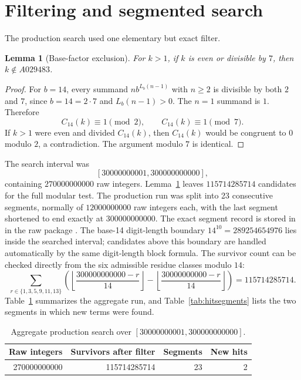 \documentclass[11pt]{article}
\newtheorem{lemma}{Lemma}
\theoremstyle{definition}
\theoremstyle{remark}
\begin{document}
\section{Filtering and segmented search}
\label{sec:search}

The production search used one elementary but exact filter.

\begin{lemma}[Base-factor exclusion]
\label{lem:filter}
For \(k>1\), if \(k\) is even or divisible by \(7\), then \(k\notin A029483\).
\end{lemma}

\begin{proof}
For \(b=14\), every summand \(n b^{L_b(n-1)}\) with \(n\ge 2\) is divisible
by both \(2\) and \(7\), since \(b=14=2\cdot 7\) and \(L_b(n-1)>0\).  The
\(n=1\) summand is \(1\).
Therefore
\[
  C_{14}(k)\equiv 1\pmod 2,\qquad C_{14}(k)\equiv 1\pmod 7.
\]
If \(k>1\) were even and divided \(C_{14}(k)\), then \(C_{14}(k)\) would be
congruent to \(0\) modulo \(2\), a contradiction.  The argument modulo \(7\)
is identical.
\end{proof}

The search interval was
\[
  [30000000001,300000000000],
\]
containing \(270000000000\) raw integers.  Lemma~\ref{lem:filter} leaves
\(115714285714\) candidates for the full modular test.  The production run
was split into 23 consecutive segments, normally of \(12000000000\) raw
integers each, with the last segment shortened to end exactly at
\(300000000000\).  The exact segment record is stored in
 in the raw package
\cite{cortiA029483Package2026}.
The base-14 digit-length boundary \(14^{10}=289254654976\) lies inside the
searched interval; candidates above this boundary are handled automatically by
the same digit-length block formula.
The survivor count can be checked directly from the six admissible residue
classes modulo \(14\):
\[
  \sum_{r\in\{1,3,5,9,11,13\}}
  \left(
    \left\lfloor\frac{300000000000-r}{14}\right\rfloor
    -
    \left\lfloor\frac{30000000000-r}{14}\right\rfloor
  \right)
  =115714285714.
\]
Table~\ref{tab:aggregate} summarizes the aggregate run, and
Table~\ref{tab:hitsegments} lists the two segments in which new terms were
found.

\begin{table}[ht]
\centering
\begin{tabular}{rrrr}
\toprule
Raw integers & Survivors after filter & Segments & New hits\\
\midrule
270000000000 & 115714285714 & 23 & 2\\
\bottomrule
\end{tabular}
\caption{Aggregate production search over
\([30000000001,300000000000]\).}
\label{tab:aggregate}
\end{table}
\end{document}
